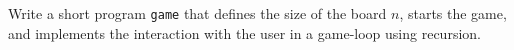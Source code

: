 Write a short program \lstinline{game} that defines the size of the
board $n$, starts the game, and implements the interaction with the
user in a game-loop using recursion.
